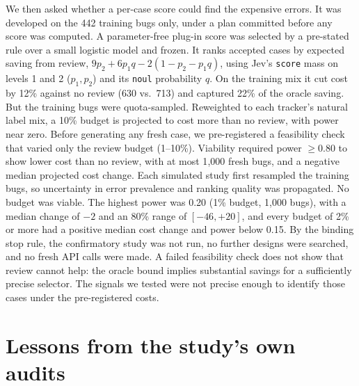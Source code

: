  We then asked whether a
per-case score could find the expensive errors. It was developed on the
442 training bugs only, under a plan committed before any score was
computed. A parameter-free plug-in score was selected by a pre-stated
rule over a small logistic model and frozen. It ranks accepted cases by
expected saving from review, $9p_2 + 6p_1q - 2(1 - p_2 - p_1q)$, using
Jev's \texttt{score} mass on levels 1 and 2 ($p_1, p_2$) and its
\texttt{noul} probability $q$. On the training mix it cut cost by 12\%
against no review (630 vs.\ 713) and captured 22\% of the oracle saving.
But the training bugs were quota-sampled. Reweighted to each tracker's
natural label mix, a 10\% budget is projected to cost more than
no review, with power near zero. Before generating any fresh case, we
pre-registered a feasibility check that varied only the review budget
(1--10\%). Viability required power $\geq 0.80$ to show lower cost than
no review, with at most 1{,}000 fresh bugs, and a negative median
projected cost change. Each simulated study first resampled the training
bugs, so uncertainty in error prevalence and ranking quality was
propagated. No budget was viable. The highest power was 0.20 (1\% budget,
1{,}000 bugs), with a median change of $-2$ and an 80\% range of
$[-46, +20]$, and every budget of 2\% or more had a positive median cost
change and power below 0.15. By the binding stop rule, the confirmatory
study was not run, no further designs were searched, and no fresh API
calls were made.
A failed feasibility check does not show that review cannot help: the
oracle bound implies substantial savings for a sufficiently precise
selector. The signals we tested were not precise enough to identify
those cases under the pre-registered costs.

\section{Lessons from the study's own audits}
\label{sec:method}

